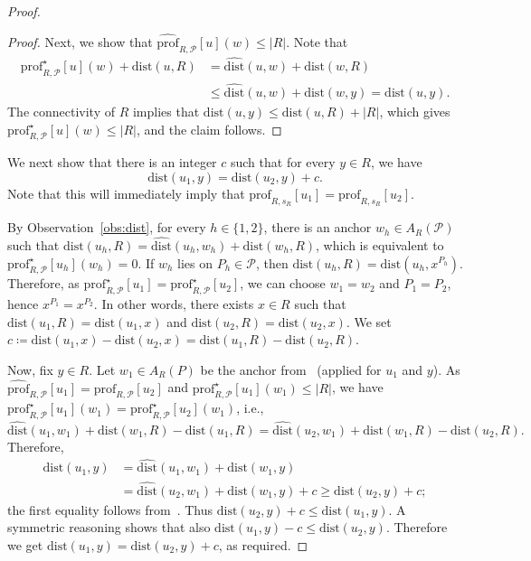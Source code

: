 \documentclass[11pt,a4paper]{article}
\newcommand{\distprofile}[3]{\mathrm{prof}_{#1,#2}[#3]}
\newcommand{\hatprofile}[3]{\widehat{\mathrm{prof}}_{#1,#2}[#3]}
\newcommand{\diststarprofile}[3]{\mathrm{prof}^\star_{#1,#2}[#3]}
\newcommand{\dist}{\mathrm{dist}}
\renewcommand{\geq}{\geqslant}
\renewcommand{\le}{\leqslant}
\begin{document}
\begin{proof}
\begin{proof}
    Next, we show that $\hatprofile{R}{\mathcal{P}}{u}(w)\le |R|$. Note that
    \begin{align*}
      \diststarprofile{R}{\mathcal{P}}{u}(w) + \dist(u,R) & = \widehat{\dist}(u,w)+\dist(w,R)\\
      & \le \widehat{\dist}(u,w)+\dist(w,y)= \dist(u,y).
    \end{align*}
    The connectivity of $R$ implies that $\dist(u,y)\le \dist(u,R)+|R|$, which gives
    $\diststarprofile{R}{\mathcal{P}}{u}(w)\le |R|$, and the claim follows.
  \end{proof}

  We next show that
  there is an integer $c$ such that for every $y\in R$, we have
  $$\dist(u_1,y)=\dist(u_2,y)+c.$$
  Note that this will immediately imply that
  $\distprofile{R}{s_R}{u_1}=\distprofile{R}{s_R}{u_2}$.

  By Observation~\ref{obs:dist}, for every $h \in \{1,2\}$, there is an anchor $w_h \in A_R(\mathcal{P})$
  such that $\dist(u_h,R) = \widehat{\dist}(u_h,w_h) + \dist(w_h, R)$, which is equivalent to
  $\diststarprofile{R}{\mathcal{P}}{u_h}(w_h) = 0$. 
  If $w_h$ lies on $P_h \in \mathcal{P}$, then $\dist(u_h,R) = \dist(u_h,x^{P_h})$. 
  Therefore, as $\diststarprofile{R}{\mathcal{P}}{u_1}=\diststarprofile{R}{\mathcal{P}}{u_2}$,
  we can choose $w_1 = w_2$ and $P_1 = P_2$, hence $x^{P_1} = x^{P_2}$. 
  In other words, there exists $x\in R$ such that $\dist(u_1,R) = \dist(u_1,x)$ and $\dist(u_2,R) = \dist(u_2,x)$.
  We set $c\coloneqq \dist(u_1,x)-\dist(u_2,x)=\dist(u_1,R)-\dist(u_2,R)$.

  Now, fix $y\in R$.
  Let $w_1\in A_R(P)$ be the anchor from~ (applied for $u_1$ and $y$).
  As $\hatprofile{R}{\mathcal{P}}{u_1} = \hatprofile{R}{\mathcal{P}}{u_2}$ and
  $\diststarprofile{R}{\mathcal{P}}{u_1}(w_1)\le |R|$, we have
   $\diststarprofile{R}{\mathcal{P}}{u_1}(w_1) = \diststarprofile{R}{\mathcal{P}}{u_2}(w_1)$, i.e.,
  \[\widehat{\dist}(u_1,w_1) + \dist(w_1,R) - \dist(u_1,R) = \widehat{\dist}(u_2,w_1) + \dist(w_1,R)- \dist(u_2,R).\]
  Therefore,
  \begin{align*}
    \dist(u_1,y) &= \widehat{\dist}(u_1,w_1) + \dist(w_1,y)\\
      & =\widehat{\dist}(u_2,w_1) + \dist(w_1,y)+c\geq \dist(u_2,y)+c;
  \end{align*}
  the first equality follows from~.
  Thus $\dist(u_2,y)+c\le \dist(u_1,y)$.
  A symmetric reasoning shows that also $\dist(u_1,y)-c\le\dist(u_2,y)$.
  Therefore we get $\dist(u_1,y) = \dist(u_2,y)+c$, as required.
\end{proof}
\end{document}
